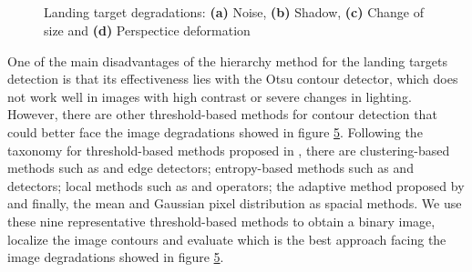 \begin{figure}[!ht]
    \centering
    \begin{subfigure}[b]{0.3\textwidth}
        \caption{}
        \label{fig:deg_noise}
    \end{subfigure}
        ~ %
    \begin{subfigure}[b]{0.3\textwidth}
        \caption{}
        \label{fig:deg_shadow}
    \end{subfigure}\\
        ~ %
    \begin{subfigure}[b]{0.3\textwidth}
        \caption{}
        \label{fig:deg_resolution}
    \end{subfigure}
        ~ %
    \begin{subfigure}[b]{0.3\textwidth}
        \caption{}
        \label{fig:deg_deformation}
    \end{subfigure}
    \caption{ Landing target degradations: \textbf{(a)} Noise, \textbf{(b)} Shadow, \textbf{(c)} Change of size and \textbf{(d)} Perspectice deformation}\label{fig:tar_degradations}
\end{figure}


One of the main disadvantages of the hierarchy method for the landing targets detection is that its effectiveness lies with the Otsu contour detector, which does not work well in images with high contrast or severe changes in lighting. However, there are other threshold-based methods for contour detection that could better face the image degradations showed in figure \ref{fig:tar_degradations}. Following the taxonomy for threshold-based methods proposed in \citep{Sezgin.Sankur:EI:2010}, there are clustering-based methods such as \cite{Otsu:SMC:1979} and \cite{Ridler.Calvard:TSMC:1978} edge detectors; entropy-based methods such as \cite{Yen.Chang.ea:TIP:1995} and \cite{Li.Lee:ICPR:1993} detectors; local methods such as \cite{Niblack:ImageProcc:1986} and \cite{Sauvola.Pietikainen:ICPR:2000} operators; the adaptive method proposed by \cite{Bradley.Roth:ACM:2007} and finally, the mean and Gaussian pixel distribution as spacial methods. 
We use these nine representative threshold-based methods to obtain a binary image, localize the image contours and evaluate which is the best approach facing the image degradations showed in figure \ref{fig:tar_degradations}.


